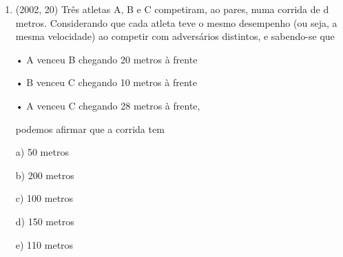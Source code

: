 \documentclass{article}
\begin{document}
\begin{enumerate}
$$
\begin{array}{l}{S_{1} \wedge S_{2} \rightarrow S=(p \rightarrow \neg q) \wedge q \rightarrow \neg p} \\ {S_{1} \wedge S_{2} \rightarrow S=(\neg p \vee \neg q) \wedge q \rightarrow \neg p} \\ {S_{1} \wedge S_{2} \rightarrow S=(\neg p \wedge q) \vee(\neg q \wedge q) \rightarrow \neg p} \\ {S_{1} \wedge S_{2} \rightarrow S=(\neg p \wedge q) \vee F A L S 0 \rightarrow \neg p} \\ {S_{1} \wedge S_{2} \rightarrow S=(\neg p \wedge q) \vee F A L S 0 \rightarrow \neg p} \\ {S_{1} \wedge S_{2} \rightarrow S=(\neg p \wedge q) \rightarrow \neg p} \\ {S_{1} \wedge S_{2} \rightarrow S=p \vee \neg q \vee r p} \\ {S_{1} \wedge S_{2} \rightarrow S=p \vee \neg p \vee \neg q} \\ {S_{1} \wedge S_{2} \rightarrow S=V E R D A D E I R 0 \quad \vee \neg q} \\ {S_{1} \wedge S_{2} \rightarrow S=V E R D A D E I R 0}\end{array}
$$\newline

b)\newline


\textbf{CONTEÚDO}

$\rule[1cm]{100cm}{1px}$





\newpage






\item(2002, 20) Três atletas A, B e C competiram, ao pares, numa corrida de d metros. Considerando que cada atleta teve o mesmo desempenho (ou seja, a mesma velocidade) ao competir com adversários distintos, e sabendo-se que

• A venceu B chegando 20 metros à frente

• B venceu C chegando 10 metros à frente

• A venceu C chegando 28 metros à frente,

podemos afirmar que a corrida tem

a) 50 metros

b) 200 metros

c) 100 metros

d) 150 metros

e) 110 metros \newline




















\end{enumerate}
\end{document}
